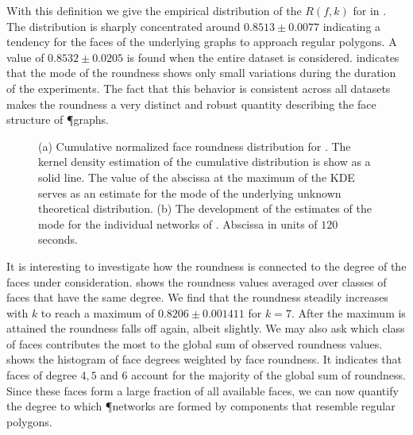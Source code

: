 		With this definition we give the empirical distribution of the $R(f,k)$ for  in . The distribution is sharply concentrated around $0.8513 \pm 0.0077$ indicating a tendency for the faces of the underlying graphs to approach regular polygons. A value of $0.8532 \pm 0.0205$ is found when the entire dataset is considered.  indicates that the mode of the roundness shows only small variations during the duration of the experiments. The fact that this behavior is consistent across all datasets makes the roundness a very distinct and robust quantity describing the face structure of \P graphs.

		\begin{figure}
			\centering
			\qquad

			\caption[Face roundness distribution.]{(a) Cumulative normalized face roundness distribution for . The kernel density estimation of the cumulative distribution is show as a solid line. The value of the abscissa at the maximum of the KDE serves as an estimate for the mode of the underlying unknown theoretical distribution. (b) The development of the estimates of the mode for the individual networks of . Abscissa in units of $120$ seconds.}
		\end{figure}

		It is interesting to investigate how the roundness is connected to the degree of the faces under consideration.  shows the roundness values averaged over classes of faces that have the same degree. We find that the roundness steadily increases with $k$ to reach a maximum of $0.8206 \pm 0.001411$ for $k=7$. After the maximum is attained the roundness falls off again, albeit slightly. We may also ask which class of faces contributes the most to the global sum of observed roundness values.  shows the histogram of face degrees weighted by face roundness. It indicates that faces of degree  $4,5$ and $6$ account for the majority of the global sum of roundness. Since these faces form a large fraction of all available faces, we can now quantify the degree to which \P networks are formed by components that resemble regular polygons.

